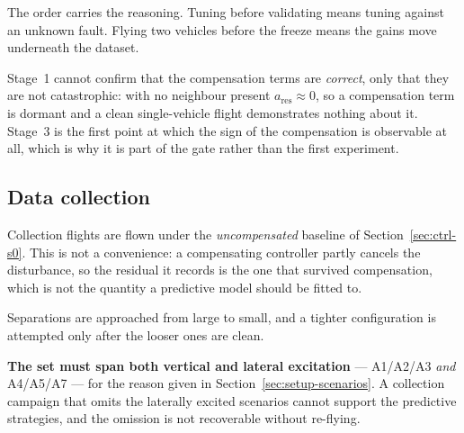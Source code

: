 The order carries the reasoning. Tuning before validating means tuning against an unknown fault.
Flying two vehicles before the freeze means the gains move underneath the dataset.

Stage~1 cannot confirm that the compensation terms are \emph{correct}, only that they are not
catastrophic: with no neighbour present $a_{\mathrm{res}} \approx 0$, so a compensation term is
dormant and a clean single-vehicle flight demonstrates nothing about it. Stage~3 is the first point
at which the sign of the compensation is observable at all, which is why it is part of the gate
rather than the first experiment.

\subsection{Data collection}
\label{sec:setup-collect}

Collection flights are flown under the \emph{uncompensated} baseline of
Section~\ref{sec:ctrl-s0}. This is not a convenience: a compensating controller partly cancels the
disturbance, so the residual it records is the one that survived compensation, which is not the
quantity a predictive model should be fitted to.

Separations are approached from large to small, and a tighter configuration is attempted only after
the looser ones are clean.

\textbf{The set must span both vertical and lateral excitation} --- A1/A2/A3 \emph{and} A4/A5/A7
--- for the reason given in Section~\ref{sec:setup-scenarios}. A collection campaign that omits the
laterally excited scenarios cannot support the predictive strategies, and the omission is not
recoverable without re-flying.

